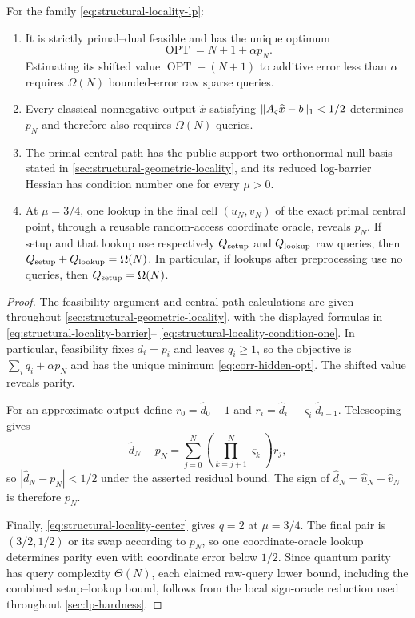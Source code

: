 \begin{theorem}
\label{thm:corr-hidden-sign}
For the family \eqref{eq:structural-locality-lp}:
\begin{enumerate}[leftmargin=*]
 \item It is strictly primal--dual feasible and has the unique optimum
 \begin{equation}
  \operatorname{OPT}=N+1+\alpha p_N.                    \label{eq:corr-hidden-opt}
 \end{equation}
 Estimating its shifted value $\operatorname{OPT}-(N+1)$ to additive error
 less than $\alpha$ requires $\Omega(N)$ bounded-error raw sparse queries.
 \item Every classical nonnegative output $\widehat x$ satisfying
 $\lVert A_\varsigma\widehat x-b\rVert_1<1/2$ determines $p_N$ and therefore also
 requires $\Omega(N)$ queries.
 \item The primal central path has the public support-two orthonormal null
 basis stated in \cref{sec:structural-geometric-locality}, and its reduced
 log-barrier Hessian has condition number one for every $\mu>0$.
 \item At $\mu=3/4$, one lookup in the final cell $(u_N,v_N)$ of the
 exact primal central point, through a reusable random-access coordinate
 oracle, reveals $p_N$.  If setup and
 that lookup use respectively $Q_{\rm setup}$ and $Q_{\rm lookup}$ raw
 queries, then
 $Q_{\rm setup}+Q_{\rm lookup}=\Omega(N)$.  In particular, if lookups after
 preprocessing use no queries, then $Q_{\rm setup}=\Omega(N)$.
\end{enumerate}
\end{theorem}

\begin{proof}
The feasibility argument and central-path calculations are given throughout
\cref{sec:structural-geometric-locality}, with the displayed formulas in
\eqref{eq:structural-locality-barrier}--
\eqref{eq:structural-locality-condition-one}.  In particular, feasibility
fixes $d_i=p_i$ and leaves $q_i\geq1$, so the objective is
$\sum_iq_i+\alpha p_N$ and has the unique minimum
\eqref{eq:corr-hidden-opt}.  The shifted value reveals parity.

For an approximate output define
$r_0=\widehat d_0-1$ and
$r_i=\widehat d_i-\varsigma_i\widehat d_{i-1}$.  Telescoping gives
\begin{equation}
 \widehat d_N-p_N
 =\sum_{j=0}^N\left(\prod_{k=j+1}^N\varsigma_k\right)r_j,               \label{eq:corr-hidden-telescope}
\end{equation}
so $|\widehat d_N-p_N|<1/2$ under the asserted residual bound.  The sign of
$\widehat d_N=\widehat u_N-\widehat v_N$ is therefore $p_N$.

Finally, \eqref{eq:structural-locality-center} gives $q=2$ at $\mu=3/4$.
The final pair is $(3/2,1/2)$ or its swap according to $p_N$, so one
coordinate-oracle lookup determines parity even with coordinate error below
$1/2$.  Since quantum parity has query complexity $\Theta(N)$, each claimed
raw-query lower bound, including the combined setup--lookup bound, follows
from the local sign-oracle reduction used throughout \cref{sec:lp-hardness}.
\end{proof}

